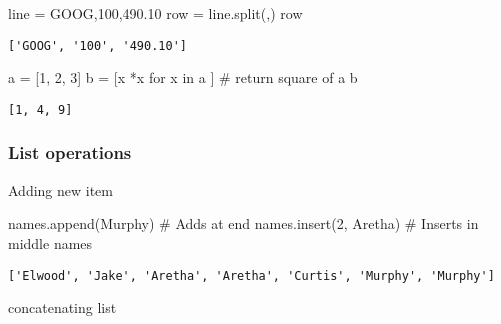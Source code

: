 \documentclass[
  letterpaper,
  DIV=11,
  numbers=noendperiod]{scrreprt}
\newenvironment{Shaded}{\begin{snugshade}}{\end{snugshade}}
\newcommand{\CommentTok}[1]{\textcolor[rgb]{0.37,0.37,0.37}{#1}}
\newcommand{\ControlFlowTok}[1]{\textcolor[rgb]{0.00,0.46,0.62}{#1}}
\newcommand{\ControlFlowTok}[1]{\textcolor[rgb]{0.00,0.48,0.65}{#1}}
\newcommand{\DecValTok}[1]{\textcolor[rgb]{0.68,0.00,0.00}{#1}}
\newcommand{\KeywordTok}[1]{\textcolor[rgb]{0.00,0.46,0.62}{#1}}
\newcommand{\NormalTok}[1]{\textcolor[rgb]{0.00,0.46,0.62}{#1}}
\newcommand{\OperatorTok}[1]{\textcolor[rgb]{0.37,0.37,0.37}{#1}}
\newcommand{\KeywordTok}[1]{\textcolor[rgb]{0.00,0.48,0.65}{#1}}
\newcommand{\NormalTok}[1]{\textcolor[rgb]{0.00,0.48,0.65}{#1}}
\newcommand{\OperatorTok}[1]{\textcolor[rgb]{0.37,0.37,0.37}{#1}}
\newcommand{\StringTok}[1]{\textcolor[rgb]{0.13,0.47,0.30}{#1}}
\begin{document}
\begin{Shaded}
\begin{Highlighting}[]
\begin{Shaded}
\begin{Highlighting}[]
\NormalTok{line }\OperatorTok{=} \StringTok{\textquotesingle{}GOOG,100,490.10\textquotesingle{}}
\NormalTok{row }\OperatorTok{=}\NormalTok{ line.split(}\StringTok{\textquotesingle{},\textquotesingle{}}\NormalTok{)}
\NormalTok{row}
\end{Highlighting}
\end{Shaded}

\begin{verbatim}
['GOOG', '100', '490.10']
\end{verbatim}

\begin{Shaded}
\begin{Highlighting}[]
\NormalTok{a }\OperatorTok{=}\NormalTok{ [}\DecValTok{1}\NormalTok{, }\DecValTok{2}\NormalTok{, }\DecValTok{3}\NormalTok{]}
\NormalTok{b }\OperatorTok{=}\NormalTok{  [x }\OperatorTok{*}\NormalTok{x }\ControlFlowTok{for}\NormalTok{ x }\KeywordTok{in}\NormalTok{ a ] }\CommentTok{\# return square of a}
\NormalTok{b}
\end{Highlighting}
\end{Shaded}

\begin{verbatim}
[1, 4, 9]
\end{verbatim}

\hypertarget{list-operations}{%
\subsubsection{List operations}\label{list-operations}}

Adding new item

\begin{Shaded}
\begin{Highlighting}[]
\NormalTok{names.append(}\StringTok{\textquotesingle{}Murphy\textquotesingle{}}\NormalTok{)    }\CommentTok{\# Adds at end}
\NormalTok{names.insert(}\DecValTok{2}\NormalTok{, }\StringTok{\textquotesingle{}Aretha\textquotesingle{}}\NormalTok{) }\CommentTok{\# Inserts in middle}
\NormalTok{names}
\end{Highlighting}
\end{Shaded}

\begin{verbatim}
['Elwood', 'Jake', 'Aretha', 'Aretha', 'Curtis', 'Murphy', 'Murphy']
\end{verbatim}

concatenating list


\end{Highlighting}
\end{Shaded}
\end{document}
